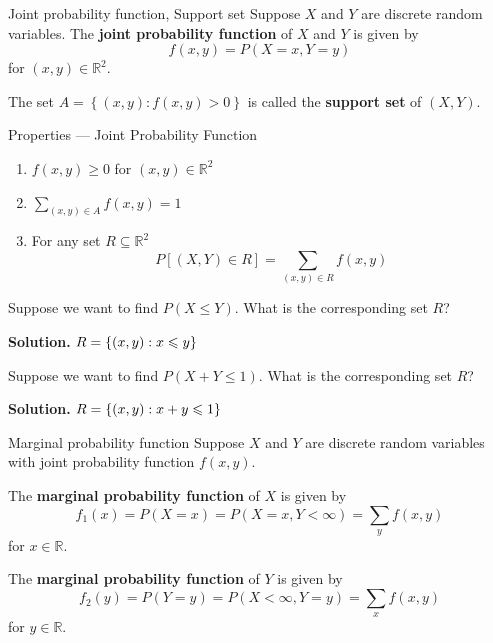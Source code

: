 \begin{Definition}{Joint probability function, Support set}{}
    Suppose $ X $ and $ Y $ are discrete random variables.
    The \textbf{joint probability function} of $ X $ and $ Y $
    is given by
    \[ f(x,y)=P(X=x,Y=y) \]
    for $ (x,y)\in\mathbb{R}^2 $.

    The set $ A=\left\{ (x,y):f(x,y)>0 \right\} $ is called
    the \textbf{support set} of $ (X,Y) $.
\end{Definition}

\begin{Definition}{Properties --- Joint Probability Function}{}
    \begin{enumerate}[label=(\Roman*)]
        \item $ f(x,y)\geqslant 0 $ for $ (x,y)\in\mathbb{R}^2 $
        \item $ \displaystyle \sum\limits_{(x,y)\in A}
                  f(x,y)=1 $
        \item For any set $ R\subseteq \mathbb{R}^2 $
              \[ P\left[ (X,Y)\in R \right]
                  =\sum\limits_{(x,y)\in R}f(x,y)  \]
    \end{enumerate}
\end{Definition}

\begin{Example}{}{}
    Suppose we want to find $ P(X\leqslant Y) $. What is the
    corresponding set $ R $?

    \textbf{Solution.} $ R=\{(x,y):x\leqslant y\} $

    Suppose we want to find $ P(X+Y\leqslant 1) $. What is the corresponding
    set $ R $?

    \textbf{Solution.} $ R=\{(x,y):x+y\leqslant 1\} $
\end{Example}

\begin{Definition}{Marginal probability function}{}
    Suppose $ X $ and $ Y $ are discrete
    random variables with joint probability
    function $ f(x,y) $.

    The \textbf{marginal probability
        function} of $ X $ is given by
    \[ f_1(x)=P(X=x)=P(X=x,Y<\infty)=\sum\limits_{y}f(x,y)  \]
    for $ x\in\mathbb{R} $.

    The \textbf{marginal probability function} of $ Y $
    is given by
    \[ f_2(y)=P(Y=y)=P(X<\infty,Y=y)=\sum\limits_{x}f(x,y)  \]
    for $ y\in\mathbb{R} $.
\end{Definition}

